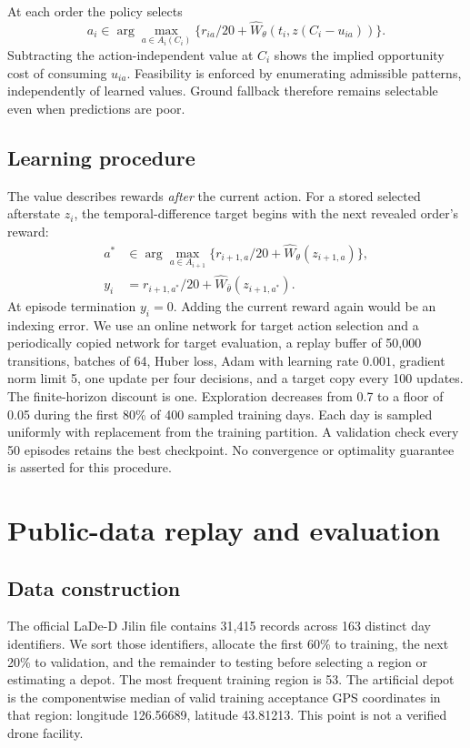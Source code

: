 \documentclass[11pt,a4paper]{article}
\begin{document}
At each order the policy selects
\begin{equation}
a_i\in\arg\max_{a\in A_i(C_i)}\{r_{ia}/20+\widehat W_\theta(t_i,z(C_i-u_{ia}))\}.
\end{equation}
Subtracting the action-independent value at $C_i$ shows the implied opportunity cost of consuming $u_{ia}$. Feasibility is enforced by enumerating admissible patterns, independently of learned values. Ground fallback therefore remains selectable even when predictions are poor.

\subsection{Learning procedure}
The value describes rewards \emph{after} the current action. For a stored selected afterstate $z_i$, the temporal-difference target begins with the next revealed order's reward:
\begin{align}
a^*&\in\arg\max_{a\in A_{i+1}}\{r_{i+1,a}/20+\widehat W_\theta(z_{i+1,a})\},\\
y_i&=r_{i+1,a^*}/20+\widehat W_{\bar\theta}(z_{i+1,a^*}).
\end{align}
At episode termination $y_i=0$. Adding the current reward again would be an indexing error. We use an online network for target action selection and a periodically copied network for target evaluation, a replay buffer of 50,000 transitions, batches of 64, Huber loss, Adam with learning rate $0.001$, gradient norm limit 5, one update per four decisions, and a target copy every 100 updates. The finite-horizon discount is one. Exploration decreases from 0.7 to a floor of 0.05 during the first 80\% of 400 sampled training days. Each day is sampled uniformly with replacement from the training partition. A validation check every 50 episodes retains the best checkpoint. No convergence or optimality guarantee is asserted for this procedure.

\section{Public-data replay and evaluation}
\subsection{Data construction}
The official LaDe-D Jilin file contains 31,415 records across 163 distinct day identifiers. We sort those identifiers, allocate the first 60\% to training, the next 20\% to validation, and the remainder to testing before selecting a region or estimating a depot. The most frequent training region is 53. The artificial depot is the componentwise median of valid training acceptance GPS coordinates in that region: longitude 126.56689, latitude 43.81213. This point is not a verified drone facility.
\end{document}
